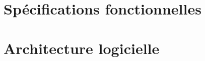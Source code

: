 \documentclass[11pt,oneside]{book}
\begin{document}


\pagestyle{empty}
\selectfont

\setlength{\parindent}{4mm}

\setcounter{tocdepth}{1}
\tableofcontents
{}




\chapter{Spécifications fonctionnelles}


    









\chapter{Architecture logicielle}








%
%

%


\end{document}
